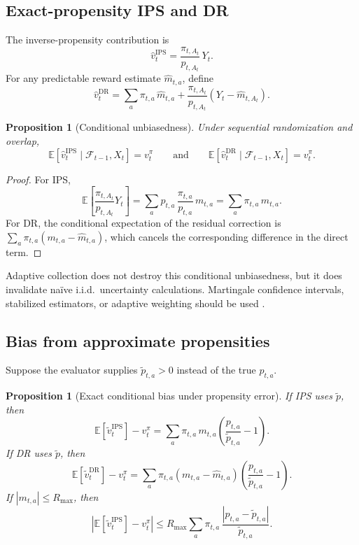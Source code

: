 \documentclass[11pt]{article}
\newtheorem{proposition}[theorem]{Proposition}
\newcommand{\E}{\mathbb{E}}
\begin{document}
\subsection{Exact-propensity IPS and DR}

The inverse-propensity contribution is
\[
\widehat v_t^{\mathrm{IPS}} = \frac{\pi_{t,A_t}}{p_{t,A_t}}\, Y_t.
\]
For any predictable reward estimate $\widehat m_{t,a}$, define
\[
\widehat v_t^{\mathrm{DR}}
=
\sum_a \pi_{t,a}\, \widehat m_{t,a}
+
\frac{\pi_{t,A_t}}{p_{t,A_t}}
\left( Y_t - \widehat m_{t,A_t} \right).
\]

\begin{proposition}[Conditional unbiasedness]
\label{prop:unbiased}
Under sequential randomization and overlap,
\[
\E[\widehat v_t^{\mathrm{IPS}} \mid \mathcal{F}_{t-1}, X_t] = v_t^\pi
\qquad\text{and}\qquad
\E[\widehat v_t^{\mathrm{DR}} \mid \mathcal{F}_{t-1}, X_t] = v_t^\pi.
\]
\end{proposition}

\begin{proof}
For IPS,
\[
\E\!\left[ \frac{\pi_{t,A_t}}{p_{t,A_t}} Y_t \right]
=
\sum_a p_{t,a}\, \frac{\pi_{t,a}}{p_{t,a}}\, m_{t,a}
=
\sum_a \pi_{t,a}\, m_{t,a}.
\]
For DR, the conditional expectation of the residual correction is $\sum_a \pi_{t,a} (m_{t,a} - \widehat m_{t,a})$, which cancels the corresponding difference in the direct term.
\end{proof}

Adaptive collection does not destroy this conditional unbiasedness, but it does invalidate na\"ive i.i.d.\ uncertainty calculations. Martingale confidence intervals, stabilized estimators, or adaptive weighting should be used \parencite{hadad2021,zhan2021}.

\subsection{Bias from approximate propensities}

Suppose the evaluator supplies $\widetilde p_{t,a} > 0$ instead of the true $p_{t,a}$.

\begin{proposition}[Exact conditional bias under propensity error]
\label{prop:bias}
If IPS uses $\widetilde p$, then
\[
\E[\widetilde v_t^{\mathrm{IPS}}] - v_t^\pi
=
\sum_a \pi_{t,a}\, m_{t,a}
\left( \frac{p_{t,a}}{\widetilde p_{t,a}} - 1 \right).
\]
If DR uses $\widetilde p$, then
\[
\E[\widetilde v_t^{\mathrm{DR}}] - v_t^\pi
=
\sum_a \pi_{t,a}
\left( m_{t,a} - \widehat m_{t,a} \right)
\left( \frac{p_{t,a}}{\widetilde p_{t,a}} - 1 \right).
\]
If $|m_{t,a}| \le R_{\max}$, then
\[
\left| \E[\widetilde v_t^{\mathrm{IPS}}] - v_t^\pi \right|
\le
R_{\max} \sum_a \pi_{t,a}\,
\frac{|p_{t,a} - \widetilde p_{t,a}|}{\widetilde p_{t,a}}.
\]
\end{proposition}
\end{document}
